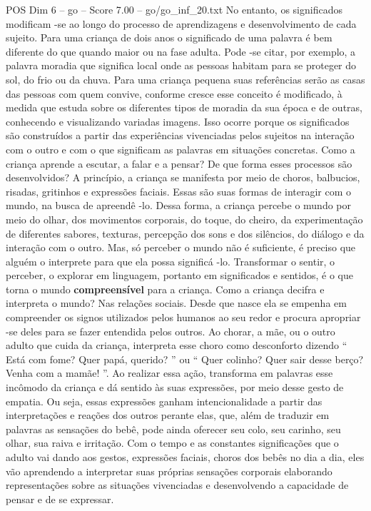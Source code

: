 \begin{textsample}{POS Dim 6 – go – Score 7.00 – go/go\_inf\_20.txt}
No entanto, os significados modificam -se ao longo do processo de aprendizagens e desenvolvimento de cada sujeito.
Para uma criança de dois anos o significado de uma palavra é bem diferente do que quando maior ou na fase adulta.
Pode -se citar, por exemplo, a palavra moradia que significa local onde as pessoas habitam para se proteger do sol, do frio ou da chuva.
Para uma criança pequena suas referências serão as casas das pessoas com quem convive, conforme cresce esse conceito é modificado, à medida que estuda sobre os diferentes tipos de moradia da sua época e de outras, conhecendo e visualizando variadas imagens.
Isso ocorre porque os significados são construídos a partir das experiências vivenciadas pelos sujeitos na interação com o outro e com o que significam as palavras em situações concretas.
Como a criança aprende a escutar, a falar e a pensar?
De que forma esses processos são desenvolvidos?
A princípio, a criança se manifesta por meio de choros, balbucios, risadas, gritinhos e expressões faciais.
Essas são suas formas de interagir com o mundo, na busca de apreendê -lo.
Dessa forma, a criança percebe o mundo por meio do olhar, dos movimentos corporais, do toque, do cheiro, da experimentação de diferentes sabores, texturas, percepção dos sons e dos silêncios, do diálogo e da interação com o outro.
Mas, só perceber o mundo não é suficiente, é preciso que alguém o interprete para que ela possa significá -lo.
Transformar o sentir, o perceber, o explorar em linguagem, portanto em significados e sentidos, é o que torna o mundo \textbf{compreensível} para a criança.
Como a criança decifra e interpreta o mundo?
Nas relações sociais.
Desde que nasce ela se empenha em compreender os signos utilizados pelos humanos ao seu redor e procura apropriar -se deles para se fazer entendida pelos outros.
Ao chorar, a mãe, ou o outro adulto que cuida da criança, interpreta esse choro como desconforto dizendo “ Está com fome?
Quer papá, querido? ” ou “ Quer colinho?
Quer sair desse berço?
Venha com a mamãe! ”.
Ao realizar essa ação, transforma em palavras esse incômodo da criança e dá sentido às suas expressões, por meio desse gesto de empatia.
Ou seja, essas expressões ganham intencionalidade a partir das interpretações e reações dos outros perante elas, que, além de traduzir em palavras as sensações do bebê, pode ainda oferecer seu colo, seu carinho, seu olhar, sua raiva e irritação.
Com o tempo e as constantes significações que o adulto vai dando aos gestos, expressões faciais, choros dos bebês no dia a dia, eles vão aprendendo a interpretar suas próprias sensações corporais elaborando representações sobre as situações vivenciadas e desenvolvendo a capacidade de pensar e de se expressar.

\end{textsample}
